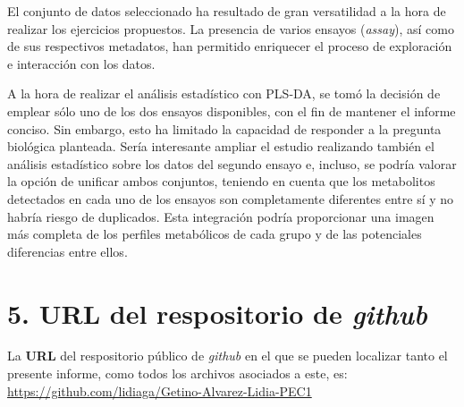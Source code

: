 \documentclass[
]{article}
\begin{document}
El conjunto de datos seleccionado ha resultado de gran versatilidad a la
hora de realizar los ejercicios propuestos. La presencia de varios
ensayos (\emph{assay}), así como de sus respectivos metadatos, han
permitido enriquecer el proceso de exploración e interacción con los
datos.

A la hora de realizar el análisis estadístico con PLS-DA, se tomó la
decisión de emplear sólo uno de los dos ensayos disponibles, con el fin
de mantener el informe conciso. Sin embargo, esto ha limitado la
capacidad de responder a la pregunta biológica planteada. Sería
interesante ampliar el estudio realizando también el análisis
estadístico sobre los datos del segundo ensayo e, incluso, se podría
valorar la opción de unificar ambos conjuntos, teniendo en cuenta que
los metabolitos detectados en cada uno de los ensayos son completamente
diferentes entre sí y no habría riesgo de duplicados. Esta integración
podría proporcionar una imagen más completa de los perfiles metabólicos
de cada grupo y de las potenciales diferencias entre ellos.

\section{\texorpdfstring{5. URL del respositorio de
\emph{github}}{5. URL del respositorio de github}}\label{url-del-respositorio-de-github}

La \textbf{URL} del respositorio público de \emph{github} en el que se
pueden localizar tanto el presente informe, como todos los archivos
asociados a este, es:
\url{https://github.com/lidiaga/Getino-Alvarez-Lidia-PEC1}

\renewcommand\refname{6. Bibliografía}
  
\end{document}
